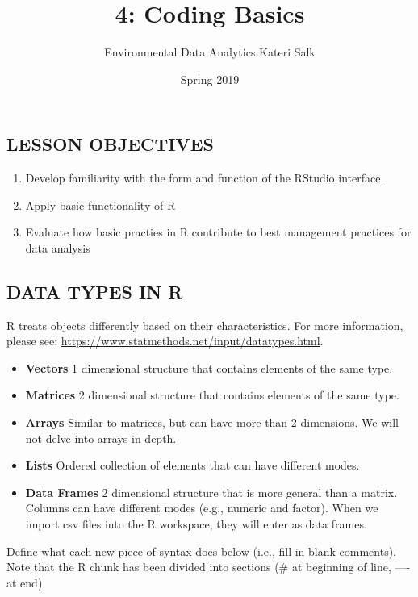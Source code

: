 \documentclass[]{article}
\title{4: Coding Basics}
\author{Environmental Data Analytics \textbar{} Kateri Salk}
\date{Spring 2019}
\providecommand{\tightlist}{%
  \setlength{\itemsep}{0pt}\setlength{\parskip}{0pt}}
\begin{document}
\maketitle

\subsection{LESSON OBJECTIVES}\label{lesson-objectives}

\begin{enumerate}
\def\labelenumi{\arabic{enumi}.}
\tightlist
\item
  Develop familiarity with the form and function of the RStudio
  interface.
\item
  Apply basic functionality of R
\item
  Evaluate how basic practies in R contribute to best management
  practices for data analysis
\end{enumerate}

\subsection{DATA TYPES IN R}\label{data-types-in-r}

R treats objects differently based on their characteristics. For more
information, please see:
\url{https://www.statmethods.net/input/datatypes.html}.

\begin{itemize}
\item
  \textbf{Vectors} 1 dimensional structure that contains elements of the
  same type.
\item
  \textbf{Matrices} 2 dimensional structure that contains elements of
  the same type.
\item
  \textbf{Arrays} Similar to matrices, but can have more than 2
  dimensions. We will not delve into arrays in depth.
\item
  \textbf{Lists} Ordered collection of elements that can have different
  modes.
\item
  \textbf{Data Frames} 2 dimensional structure that is more general than
  a matrix. Columns can have different modes (e.g., numeric and factor).
  When we import csv files into the R workspace, they will enter as data
  frames.
\end{itemize}

Define what each new piece of syntax does below (i.e., fill in blank
comments). Note that the R chunk has been divided into sections (\# at
beginning of line, ---- at end)
\end{document}
